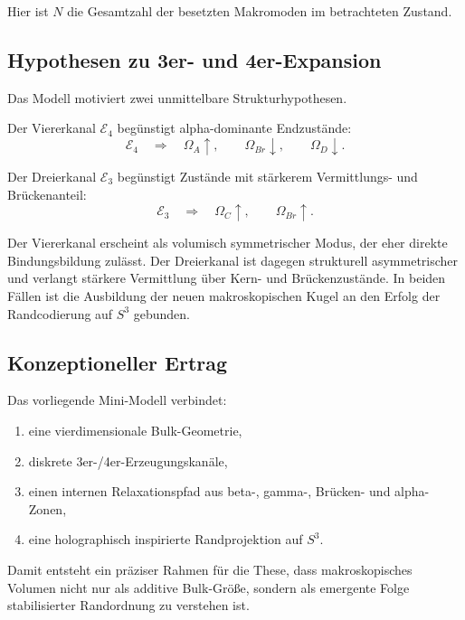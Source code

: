\documentclass[11pt,a4paper]{article}
\theoremstyle{definition}
\theoremstyle{plain}
\theoremstyle{remark}
\begin{document}
	Hier ist \(N\) die Gesamtzahl der besetzten Makromoden im betrachteten Zustand.
	
	\subsection{Hypothesen zu 3er- und 4er-Expansion}
	
	Das Modell motiviert zwei unmittelbare Strukturhypothesen.
	
	\begin{hypothesis}[Viererkanal]
		Der Viererkanal \(\mathcal{E}_4\) begünstigt alpha-dominante Endzustände:
		\[
		\mathcal{E}_4
		\quad\Rightarrow\quad
		\Omega_A \uparrow,
		\qquad
		\Omega_{Br}\downarrow,
		\qquad
		\Omega_D\downarrow.
		\]
	\end{hypothesis}
	
	\begin{hypothesis}[Dreierkanal]
		Der Dreierkanal \(\mathcal{E}_3\) begünstigt Zustände mit stärkerem Vermittlungs- und Brückenanteil:
		\[
		\mathcal{E}_3
		\quad\Rightarrow\quad
		\Omega_C \uparrow,
		\qquad
		\Omega_{Br}\uparrow.
		\]
	\end{hypothesis}
	
	\begin{interpretation}
		Der Viererkanal erscheint als volumisch symmetrischer Modus, der eher direkte Bindungsbildung zulässt. Der Dreierkanal ist dagegen strukturell asymmetrischer und verlangt stärkere Vermittlung über Kern- und Brückenzustände. In beiden Fällen ist die Ausbildung der neuen makroskopischen Kugel an den Erfolg der Randcodierung auf \(S^3\) gebunden.
	\end{interpretation}
	
	\subsection{Konzeptioneller Ertrag}
	
	Das vorliegende Mini-Modell verbindet:
	\begin{enumerate}
		\item eine vierdimensionale Bulk-Geometrie,
		\item diskrete 3er-/4er-Erzeugungskanäle,
		\item einen internen Relaxationspfad aus beta-, gamma-, Brücken- und alpha-Zonen,
		\item eine holographisch inspirierte Randprojektion auf \(S^3\).
	\end{enumerate}
	
	Damit entsteht ein präziser Rahmen für die These, dass makroskopisches Volumen nicht nur als additive Bulk-Größe, sondern als emergente Folge stabilisierter Randordnung zu verstehen ist.
	
\end{document}

